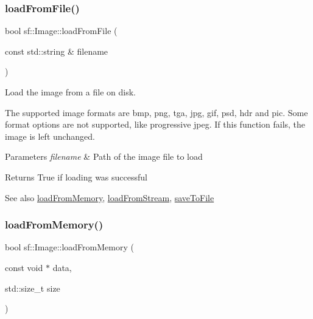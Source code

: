 \subsubsection{\texorpdfstring{load\+From\+File()}{loadFromFile()}}
{\footnotesize\ttfamily bool sf\+::\+Image\+::load\+From\+File (\begin{DoxyParamCaption}\item[{const std\+::string \&}]{filename }\end{DoxyParamCaption})}



Load the image from a file on disk. 

The supported image formats are bmp, png, tga, jpg, gif, psd, hdr and pic. Some format options are not supported, like progressive jpeg. If this function fails, the image is left unchanged.


\begin{DoxyParams}{Parameters}
{\em filename} & Path of the image file to load\\
\hline
\end{DoxyParams}
\begin{DoxyReturn}{Returns}
True if loading was successful
\end{DoxyReturn}
\begin{DoxySeeAlso}{See also}
\hyperlink{classsf_1_1_image_aaa6c7afa5851a51cec6ab438faa7354c}{load\+From\+Memory}, \hyperlink{classsf_1_1_image_a21122ded0e8368bb06ed3b9acfbfb501}{load\+From\+Stream}, \hyperlink{classsf_1_1_image_a51537fb667f47cbe80395cfd7f9e72a4}{save\+To\+File} 
\end{DoxySeeAlso}
\mbox{\label{classsf_1_1_image_aaa6c7afa5851a51cec6ab438faa7354c}} 
\subsubsection{\texorpdfstring{load\+From\+Memory()}{loadFromMemory()}}
{\footnotesize\ttfamily bool sf\+::\+Image\+::load\+From\+Memory (\begin{DoxyParamCaption}\item[{const void $\ast$}]{data,  }\item[{std\+::size\+\_\+t}]{size }\end{DoxyParamCaption})}



